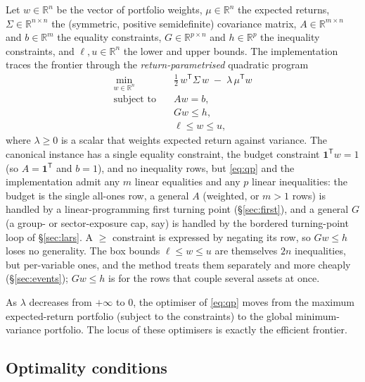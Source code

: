 \documentclass[11pt]{article}
\newcommand{\R}{\mathbb{R}}
\newcommand{\Sig}{\Sigma}
\newcommand{\lb}{\ell}              %
\newcommand{\ub}{u}                 %
\newcommand{\trans}{^{\mathsf{T}}}
\begin{document}
Let $w\in\R^n$ be the vector of portfolio weights, $\mu\in\R^n$ the expected returns,
$\Sig\in\R^{n\times n}$ the (symmetric, positive semidefinite) covariance matrix,
$A\in\R^{m\times n}$ and $b\in\R^m$ the equality constraints, $G\in\R^{p\times n}$ and
$h\in\R^p$ the inequality constraints, and $\lb,\ub\in\R^n$ the lower and upper bounds.
The implementation traces the frontier through the \emph{return-parametrised}
quadratic program
\begin{equation}
\label{eq:qp}
\begin{aligned}
\min_{w\in\R^n}\quad & \tfrac12\, w\trans \Sig\, w \;-\; \lambda\,\mu\trans w \\
\text{subject to}\quad & A w = b, \\
& G w \le h, \\
& \lb \le w \le \ub,
\end{aligned}
\end{equation}
where $\lambda \ge 0$ is a scalar that weights expected return against variance. The
canonical instance has a single equality constraint, the budget constraint
$\mathbf{1}\trans w = 1$ (so $A = \mathbf{1}\trans$ and $b = 1$), and no inequality
rows, but \eqref{eq:qp} and the implementation admit any $m$ linear equalities and any
$p$ linear inequalities: the budget is the single all-ones row, a general $A$
(weighted, or $m > 1$ rows) is handled by a linear-programming first turning point
(\S\ref{sec:first}), and a general $G$ (a group- or sector-exposure cap, say) is
handled by the bordered turning-point loop of \S\ref{sec:lars}. A $\ge$ constraint is
expressed by negating its row, so $G w \le h$ loses no generality. The box bounds
$\lb \le w \le \ub$ are themselves $2n$ inequalities, but per-variable ones, and the
method treats them separately and more cheaply (\S\ref{sec:events}); $G w \le h$ is for
the rows that couple several assets at once.

As $\lambda$ decreases from $+\infty$ to $0$, the optimiser of \eqref{eq:qp} moves from
the maximum expected-return portfolio (subject to the constraints) to the global
minimum-variance portfolio. The locus of these optimisers is exactly the efficient
frontier.

\subsection{Optimality conditions}
\end{document}
